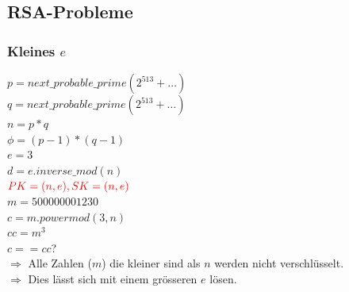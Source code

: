 \documentclass[10pt]{article}
\begin{document}
\subsection{RSA-Probleme}
\subsubsection{Kleines $e$}
$p=next\_probable\_prime(2^{513}+\dots)$ \\
$q=next\_probable\_prime(2^{513}+\dots)$ \\
$n=p*q$ \\
$\phi=(p-1)*(q-1)$ \\
$e=3$ \\
$d=e.inverse\_mod(n)$ \\
${\color{red}PK =(n,e), SK=(n,e)}$ \\
$m=500000001230$ \\
$c=m.powermod(3,n)$\\
$cc=m^3$ \\
$c==cc$? \\
{\color{blue}
$\Rightarrow$ Alle Zahlen ($m$) die kleiner sind als $n$ werden nicht verschlüsselt. \\
$\Rightarrow$ Dies lässt sich mit einem grösseren $e$ lösen.
}

\newpage
\end{document}
